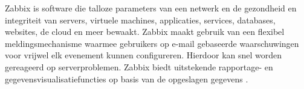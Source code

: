 Zabbix is software die talloze parameters van een netwerk en de gezondheid en integriteit van servers, virtuele machines, applicaties, services, databases, websites, de cloud en meer bewaakt. Zabbix maakt gebruik van een flexibel meldingsmechanisme waarmee gebruikers op e-mail gebaseerde waarschuwingen voor vrijwel elk evenement kunnen configureren. Hierdoor kan snel worden gereageerd op serverproblemen. Zabbix biedt uitstekende rapportage- en gegevensvisualisatiefuncties op basis van de opgeslagen gegevens \autocite{Zabbix}. 
















